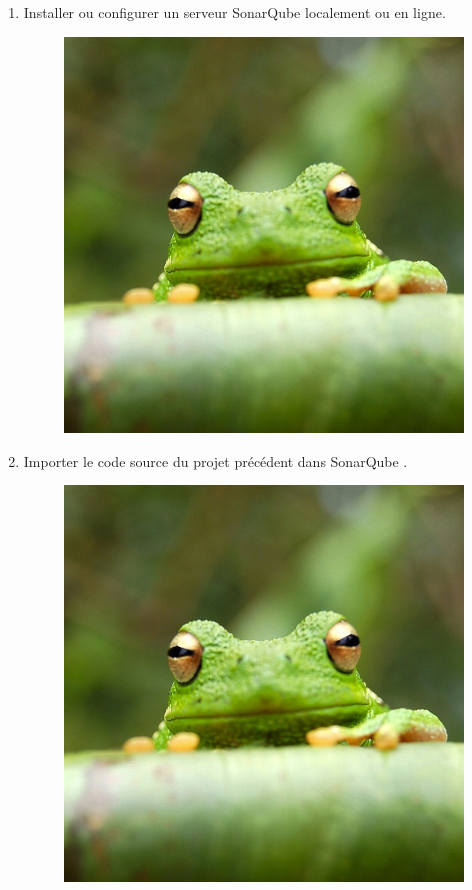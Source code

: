 \documentclass{article}
\begin{document}
\begin{enumerate}
    \item Installer ou configurer un serveur SonarQube localement ou en ligne.
    \begin{figure}[H]
        \centering
        \includegraphics[width=0.5\linewidth]{assets/frog.jpg}
        \end{figure}
    \item Importer le code source du projet précédent dans SonarQube .
    \begin{figure}[H]
        \centering
        \includegraphics[width=0.5\linewidth]{assets/frog.jpg}
        \end{figure}
    

\end{enumerate}
\end{document}
